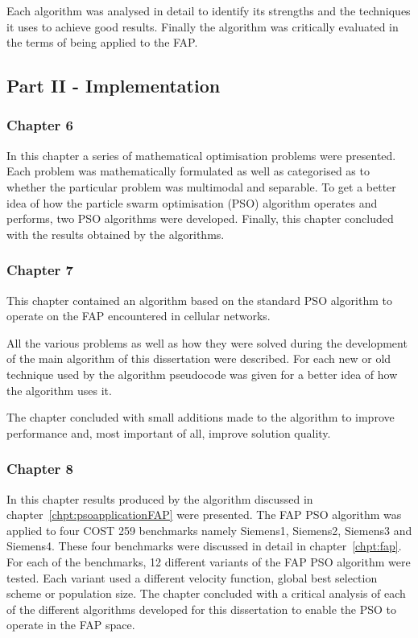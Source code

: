 Each algorithm was analysed in detail to identify its strengths and the techniques it uses to achieve good results. Finally the algorithm was critically evaluated in the terms of being applied to the FAP.
\subsection{Part II - Implementation}
\subsubsection{Chapter 6}
In this chapter a series of mathematical optimisation problems were presented. Each problem was mathematically formulated as well as categorised as to whether the particular problem was multimodal and separable.
To get a better idea of how the particle swarm optimisation (PSO) algorithm operates and performs, two PSO algorithms were developed. Finally, this chapter concluded with the results obtained by the algorithms.
\subsubsection{Chapter 7}
This chapter contained an algorithm based on the standard PSO algorithm to operate on the FAP encountered in cellular networks.

All the various problems as well as how they were solved during the development of the main algorithm of this dissertation were described. For each new or old technique used by the algorithm pseudocode was given for a better idea of how the algorithm uses it.

The chapter concluded with small additions made to the algorithm to improve performance and, most important of all, improve solution quality.
\subsubsection{Chapter 8}
In this chapter results produced by the algorithm discussed in chapter~\ref{chpt:psoapplicationFAP} were presented. The FAP PSO algorithm was applied to four COST 259 benchmarks namely Siemens1, Siemens2, Siemens3 and Siemens4. These four benchmarks were discussed in detail in chapter~\ref{chpt:fap}. For each of the benchmarks, 12 different variants of the FAP PSO algorithm were tested. Each variant used a different velocity function, global best selection scheme or population size. The chapter concluded with a critical analysis of each of the different algorithms developed for this dissertation to enable the PSO to operate in the FAP space.
